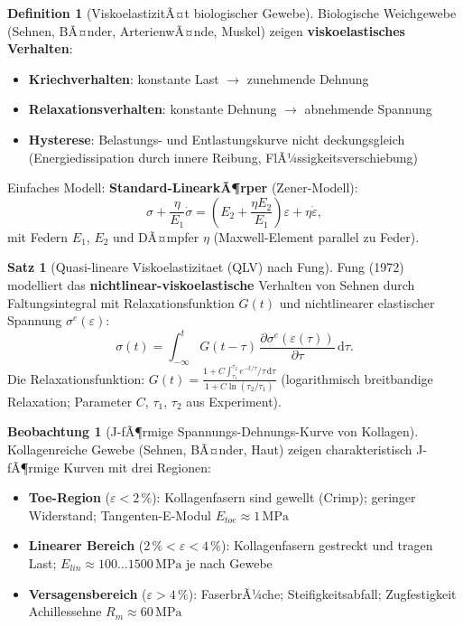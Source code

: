 ﻿\documentclass[a4paper,12pt]{report}
\theoremstyle{definition}
\newtheorem{definition}{Definition}
\newtheorem{satz}{Satz}
\newtheorem{beobachtung}{Beobachtung}
\begin{document}
\begin{definition}[ViskoelastizitÃ¤t biologischer Gewebe]
Biologische Weichgewebe (Sehnen, BÃ¤nder, ArterienwÃ¤nde, Muskel)
zeigen \textbf{viskoelastisches Verhalten}:
\begin{itemize}
    \item[-] \textbf{Kriechverhalten}: konstante Last $\to$ zunehmende Dehnung
    \item[-] \textbf{Relaxationsverhalten}: konstante Dehnung $\to$ abnehmende Spannung
    \item[-] \textbf{Hysterese}: Belastungs- und Entlastungskurve nicht deckungsgleich
          (Energiedissipation durch innere Reibung, FlÃ¼ssigkeitsverschiebung)
\end{itemize}
Einfaches Modell: \textbf{Standard-LinearkÃ¶rper} (Zener-Modell):
\[
  \sigma + \frac{\eta}{E_1}\dot{\sigma} = \left(E_2 + \frac{\eta E_2}{E_1}\right)\varepsilon
  + \eta\dot{\varepsilon},
\]
mit Federn $E_1$, $E_2$ und DÃ¤mpfer $\eta$ (Maxwell-Element parallel zu Feder).
\end{definition}

\begin{satz}[Quasi-lineare Viskoelastizitaet (QLV) nach Fung]
Fung (1972) modelliert das \textbf{nichtlinear-viskoelastische} Verhalten
von Sehnen durch Faltungsintegral mit Relaxationsfunktion $G(t)$
und nichtlinearer elastischer Spannung $\sigma^e(\varepsilon)$:
\[
  \sigma(t) = \int_{-\infty}^t G(t-\tau)\,\frac{\partial\sigma^e(\varepsilon(\tau))}{\partial\tau}\,\mathrm{d}\tau.
\]
Die Relaxationsfunktion: $G(t) = \frac{1 + C\int_{\tau_1}^{\tau_2} e^{-t/\tau}/\tau\,\mathrm{d}\tau}{1 + C\ln(\tau_2/\tau_1)}$
(logarithmisch breitbandige Relaxation; Parameter $C$, $\tau_1$, $\tau_2$ aus Experiment).
\end{satz}

\begin{beobachtung}[J-fÃ¶rmige Spannungs-Dehnungs-Kurve von Kollagen]
Kollagenreiche Gewebe (Sehnen, BÃ¤nder, Haut) zeigen charakteristisch
J-fÃ¶rmige Kurven mit drei Regionen:
\begin{itemize}
    \item[-] \textbf{Toe-Region} ($\varepsilon < 2\,\%$): Kollagenfasern sind
          gewellt (Crimp); geringer Widerstand; Tangenten-E-Modul $E_{toe} \approx 1\,\mathrm{MPa}$
    \item[-] \textbf{Linearer Bereich} ($2\,\% < \varepsilon < 4\,\%$): Kollagenfasern
          gestreckt und tragen Last; $E_{lin} \approx 100\ldots1500\,\mathrm{MPa}$ je nach Gewebe
    \item[-] \textbf{Versagensbereich} ($\varepsilon > 4\,\%$): FaserbrÃ¼che;
          Steifigkeitsabfall; Zugfestigkeit Achillessehne $R_m \approx 60\,\mathrm{MPa}$
\end{itemize}
\end{beobachtung}
\end{document}
